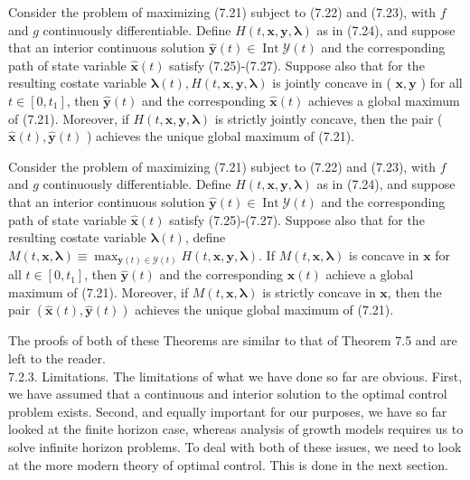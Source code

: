 \documentclass[\topdir/lecture_notes.tex]{subfiles}
\begin{document}
\begin{theorem}
Consider the problem of maximizing (7.21) subject to (7.22) and (7.23), with $f$ and $g$ continuously differentiable. Define $H(t, \mathbf{x}, \mathbf{y}, \boldsymbol{\lambda})$ as in (7.24), and suppose that an interior continuous solution $\hat{\mathbf{y}}(t) \in \operatorname{Int} \mathcal{Y}(t)$ and the corresponding path of state variable $\hat{\mathbf{x}}(t)$ satisfy (7.25)-(7.27). Suppose also that for the resulting costate variable $\boldsymbol{\lambda}(t), H(t, \mathbf{x}, \mathbf{y}, \boldsymbol{\lambda})$ is jointly concave in ( $\mathbf{x}, \mathbf{y}$ ) for all $t \in\left[0, t_{1}\right]$,
then $\hat{\mathbf{y}}(t)$ and the corresponding $\hat{\mathbf{x}}(t)$ achieves a global maximum of (7.21). Moreover, if $H(t, \mathbf{x}, \mathbf{y}, \boldsymbol{\lambda})$ is strictly jointly concave, then the pair ( $\hat{\mathbf{x}}(t), \hat{\mathbf{y}}(t)$ ) achieves the unique global maximum of (7.21).
\end{theorem}

\begin{theorem}
Consider the problem of maximizing (7.21) subject to (7.22) and (7.23), with $f$ and $g$ continuously differentiable. Define $H(t, \mathbf{x}, \mathbf{y}, \boldsymbol{\lambda})$ as in (7.24), and suppose that an interior continuous solution $\hat{\mathbf{y}}(t) \in \operatorname{Int} \mathcal{Y}(t)$ and the corresponding path of state variable $\hat{\mathbf{x}}(t)$ satisfy (7.25)-(7.27). Suppose also that for the resulting costate variable $\boldsymbol{\lambda}(t)$, define $M(t, \mathbf{x}, \boldsymbol{\lambda}) \equiv \max _{\mathbf{y}(t) \in \mathcal{Y}(t)} H(t, \mathbf{x}, \mathbf{y}, \boldsymbol{\lambda})$. If $M(t, \mathbf{x}, \boldsymbol{\lambda})$ is concave in $\mathbf{x}$ for all $t \in\left[0, t_{1}\right]$, then $\hat{\mathbf{y}}(t)$ and the corresponding $\hat{\mathbf{x}}(t)$ achieve a global maximum of (7.21). Moreover, if $M(t, \mathbf{x}, \boldsymbol{\lambda})$ is strictly concave in $\mathbf{x}$, then the pair $(\hat{\mathbf{x}}(t), \hat{\mathbf{y}}(t))$ achieves the unique global maximum of (7.21).
\end{theorem}

The proofs of both of these Theorems are similar to that of Theorem 7.5 and are left to the reader.\\
7.2.3. Limitations. The limitations of what we have done so far are obvious. First, we have assumed that a continuous and interior solution to the optimal control problem exists. Second, and equally important for our purposes, we have so far looked at the finite horizon case, whereas analysis of growth models requires us to solve infinite horizon problems. To deal with both of these issues, we need to look at the more modern theory of optimal control. This is done in the next section.
\end{document}
